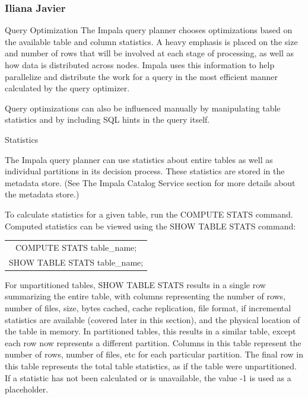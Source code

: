 \documentclass[onecolumn, draftclsnofoot,10pt, compsoc]{IEEEtran}
\begin{document}
\subsubsection{Iliana Javier}
Query Optimization
\newline
\newline
The Impala query planner chooses optimizations based on the available table and column statistics.
A heavy emphasis is placed on the size and number of rows that will be involved at each stage of processing, as well as how data is distributed across nodes.
Impala uses this information to help parallelize and distribute the work for a query in the most efficient manner calculated by the query optimizer.

Query optimizations can also be influenced manually by manipulating table statistics and by including SQL hints in the query itself.
\newline
\newline

Statistics

The Impala query planner can use statistics about entire tables as well as individual partitions in its decision process.
These statistics are stored in the metadata store.
(See The Impala Catalog Service section for more details about the metadata store.)  

To calculate statistics for a given table, run the COMPUTE STATS command. Computed statistics can be viewed using the SHOW TABLE STATS command:
\begin{center}
\begin{tabular}{ |c| }
    \hline
    COMPUTE STATS table\_name; \\
    SHOW TABLE STATS table\_name; \\
    \hline
\end{tabular}
\end{center}

For unpartitioned tables, SHOW TABLE STATS results in a single row summarizing the entire table, with columns representing the number of rows, number of files, size, bytes cached, cache replication, file format, if incremental statistics are available (covered later in this section), and the physical location of the table in memory.
In partitioned tables, this results in a similar table, except each row now represents a different partition. 
Columns in this table represent the number of rows, number of files, etc for each particular partition. 
The final row in this table represents the total table statistics, as if the table were unpartitioned. 
If a statistic has not been calculated or is unavailable, the value -1 is used as a placeholder.
\end{document}
